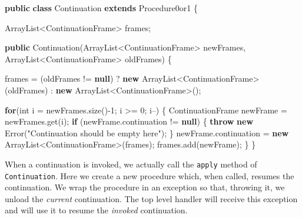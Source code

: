 \documentclass[12pt,a4paper,oneside,openright]{book}
\newenvironment{Shaded}{\begin{snugshade}}{\end{snugshade}}
\newcommand{\KeywordTok}[1]{\textcolor[rgb]{0.13,0.29,0.53}{\textbf{{#1}}}}
\newcommand{\DataTypeTok}[1]{\textcolor[rgb]{0.13,0.29,0.53}{{#1}}}
\newcommand{\DecValTok}[1]{\textcolor[rgb]{0.00,0.00,0.81}{{#1}}}
\newcommand{\StringTok}[1]{\textcolor[rgb]{0.31,0.60,0.02}{{#1}}}
\newcommand{\FunctionTok}[1]{\textcolor[rgb]{0.00,0.00,0.00}{{#1}}}
\newcommand{\NormalTok}[1]{{#1}}
\begin{document}
\begin{Shaded}
\begin{Highlighting}[]
\KeywordTok{public} \KeywordTok{class} \NormalTok{Continuation }\KeywordTok{extends} \NormalTok{Procedure0or1 \{}

    \NormalTok{ArrayList<ContinuationFrame> frames;}

    \KeywordTok{public} \FunctionTok{Continuation}\NormalTok{(ArrayList<ContinuationFrame> newFrames,}
                        \NormalTok{ArrayList<ContinuationFrame> oldFrames) \{}

        \NormalTok{frames = (oldFrames != }\KeywordTok{null}\NormalTok{)}
                 \NormalTok{? }\KeywordTok{new} \NormalTok{ArrayList<ContinuationFrame>(oldFrames)}
                 \NormalTok{: }\KeywordTok{new} \NormalTok{ArrayList<ContinuationFrame>();}

        \KeywordTok{for}\NormalTok{(}\DataTypeTok{int} \NormalTok{i = newFrames.}\FunctionTok{size}\NormalTok{()-}\DecValTok{1}\NormalTok{; i >= }\DecValTok{0}\NormalTok{; i--) \{}
            \NormalTok{ContinuationFrame newFrame = newFrames.}\FunctionTok{get}\NormalTok{(i);}
            \KeywordTok{if} \NormalTok{(newFrame.}\FunctionTok{continuation} \NormalTok{!= }\KeywordTok{null}\NormalTok{) \{}
               \KeywordTok{throw} \KeywordTok{new} \NormalTok{Error(}\StringTok{"Continuation should be empty here"}\NormalTok{);}
            \NormalTok{\}}
            \NormalTok{newFrame.}\FunctionTok{continuation}
               \NormalTok{= }\KeywordTok{new} \NormalTok{ArrayList<ContinuationFrame>(frames);}
            \NormalTok{frames.}\FunctionTok{add}\NormalTok{(newFrame);}
        \NormalTok{\}}
    \NormalTok{\}}
\end{Highlighting}
\end{Shaded}

When a continuation is invoked, we actually call the \texttt{apply}
method of \texttt{Continuation}. Here we create a new procedure which,
when called, resumes the continuation. We wrap the procedure in an
exception so that, throwing it, we unload the \emph{current}
continuation. The top level handler will receive this exception and will
use it to resume the \emph{invoked} continuation.
\end{document}
